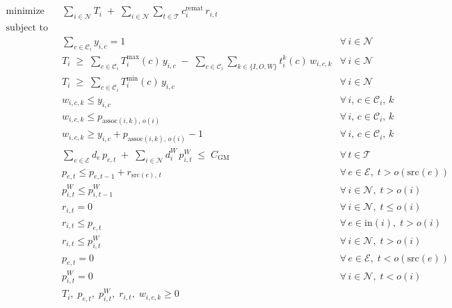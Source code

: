 \documentclass{article}
\begin{document}
\newpage


\[
\begin{aligned}
\text{minimize} \quad
  & \sum_{i \in \mathcal{N}} T_i
  \;+\; \sum_{i \in \mathcal{N}} \sum_{t \in \mathcal{T}} c_i^{\text{remat}}\, r_{i,t} \\[6pt]
%
\text{subject to} \\[4pt]
%
  & \sum_{c \in \mathcal{C}_i} y_{i,c} = 1
  & \forall\, i \in \mathcal{N} \\[4pt]
%
  & T_i \;\geq\; \sum_{c \in \mathcal{C}_i} T_i^{\max}(c)\, y_{i,c}
    \;-\; \sum_{c \in \mathcal{C}_i} \sum_{k \in \{I,O,W\}} t_i^k(c)\, w_{i,c,k}
  & \forall\, i \in \mathcal{N} \\[4pt]
%
  & T_i \;\geq\; \sum_{c \in \mathcal{C}_i} T_i^{\min}(c)\, y_{i,c}
  & \forall\, i \in \mathcal{N} \\[4pt]
%
  & w_{i,c,k} \leq y_{i,c}
  & \forall\, i,\, c \in \mathcal{C}_i,\, k \\[2pt]
  & w_{i,c,k} \leq p_{\text{assoc}(i,k),\, o(i)}
  & \forall\, i,\, c \in \mathcal{C}_i,\, k \\[2pt]
  & w_{i,c,k} \geq y_{i,c} + p_{\text{assoc}(i,k),\, o(i)} - 1
  & \forall\, i,\, c \in \mathcal{C}_i,\, k \\[4pt]
%
  & \sum_{e \in \mathcal{E}} d_e\, p_{e,t}
    \;+\; \sum_{i \in \mathcal{N}} d_i^W\, p_{i,t}^W
    \;\leq\; C_{\text{GM}}
  & \forall\, t \in \mathcal{T} \\[4pt]
%
  & p_{e,t} \leq p_{e,t-1} + r_{\text{src}(e),\, t}
  & \forall\, e \in \mathcal{E},\; t > o(\text{src}(e)) \\[4pt]
%
  & p_{i,t}^W \leq p_{i,t-1}^W
  & \forall\, i \in \mathcal{N},\; t > o(i) \\[4pt]
%
  & r_{i,t} = 0
  & \forall\, i \in \mathcal{N},\; t \leq o(i) \\[4pt]
%
  & r_{i,t} \leq p_{e,t}
  & \forall\, e \in \text{in}(i),\; t > o(i) \\[4pt]
%
  & r_{i,t} \leq p_{i,t}^W
  & \forall\, i \in \mathcal{N},\; t > o(i) \\[4pt]
%
  & p_{e,t} = 0
  & \forall\, e \in \mathcal{E},\; t < o(\text{src}(e)) \\[2pt]
  & p_{i,t}^W = 0
  & \forall\, i \in \mathcal{N},\; t < o(i) \\[4pt]
%
  & T_i,\; p_{e,t},\; p_{i,t}^W,\; r_{i,t},\; w_{i,c,k} \geq 0
\end{aligned}
\]
\end{document}
